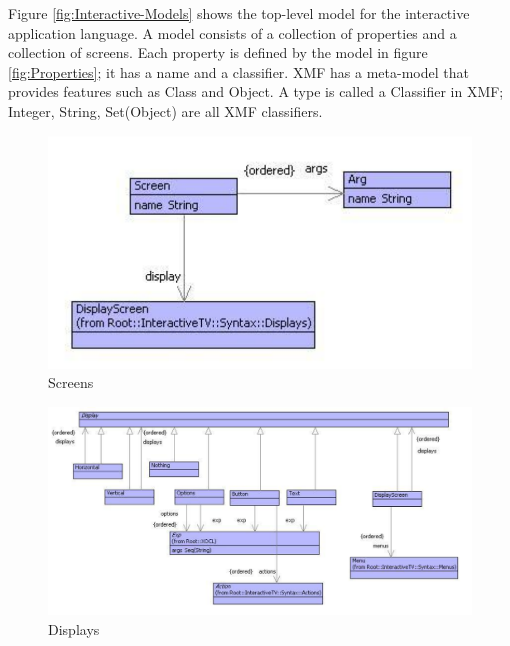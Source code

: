 Figure \ref{fig:Interactive-Models} shows the top-level model for
the interactive application language. A model consists of a collection
of properties and a collection of screens. Each property is defined
by the model in figure \ref{fig:Properties}; it has a name and a
classifier. XMF has a meta-model that provides features such as Class
and Object. A type is called a Classifier in XMF; Integer, String,
Set(Object) are all XMF classifiers.

%
\begin{figure}
\begin{center}
\includegraphics[scale=0.75]{CaseStudy4/figures/Screen.pdf}

\caption{Screens\label{fig:Screens}}
\end{center}
\end{figure}


%
\begin{figure}
\begin{center}
\includegraphics[scale=0.4]{CaseStudy4/figures/Displays.pdf}

\caption{Displays\label{fig:Displays}}
\end{center}
\end{figure}


